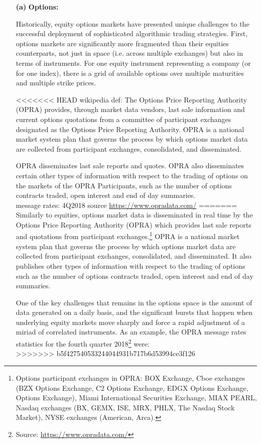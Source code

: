 \begin{enumerate}
\item[\textbf{(a)}] \textbf{Options:} 


Historically, equity options markets have presented unique challenges to the successful deployment of sophisticated algorithmic trading strategies. First, options markets are significantly more fragmented than their equities counterparts, not just in space (i.e. across multiple exchanges) but also in terms of instruments. For one equity instrument representing a company (or for one index), there is a grid of available options over multiple maturities and multiple strike prices.  

<<<<<<< HEAD
wikipedia def:
The Options Price Reporting Authority (OPRA) provides, through market data vendors, last sale information and current options quotations from a committee of participant exchanges designated as the Options Price Reporting Authority. OPRA is a national market system plan that governs the process by which options market data are collected from participant exchanges, consolidated, and disseminated.

OPRA disseminates last sale reports and quotes. OPRA also disseminates certain other types of information with respect to the trading of options on the markets of the OPRA Participants, such as the number of options contracts traded, open interest and end of day summaries. \\

message rates: 4Q2018 source \url{https://www.opradata.com/}
=======
Similarly to equities, options market data is disseminated in real time by the Options Price Reporting Authority (OPRA) which provides last sale reports and quotations from participant exchanges.\footnote{Options participant exchanges in OPRA: BOX Exchange, Cboe exchanges (BZX Options Exchange, C2 Options Exchange, EDGX Options Exchange, Options Exchange), Miami International Securities Exchange, MIAX PEARL, Nasdaq exchanges (BX, GEMX, ISE, MRX, PHLX, The Nasdaq Stock Market), NYSE exchanges (American, Arca).} OPRA is a national market system plan that governs the process by which options market data are collected from participant exchanges, consolidated, and disseminated. It also publishes other types of information with respect to the trading of options such as the number of options contracts traded, open interest and end of day summaries. 

One of the key challenges that remains in the options space is the amount of data generated on a daily basis, and the significant bursts that happen when underlying equity markets move sharply and force a rapid adjustment of a miriad of correlated instruments. As an example, the OPRA message rates statistics for the fourth quarter 2018\footnote{Source: \url{https://www.opradata.com/}} were: \\
>>>>>>> b5f427540533244044931b717b6d53994ce3f126


\end{enumerate}
